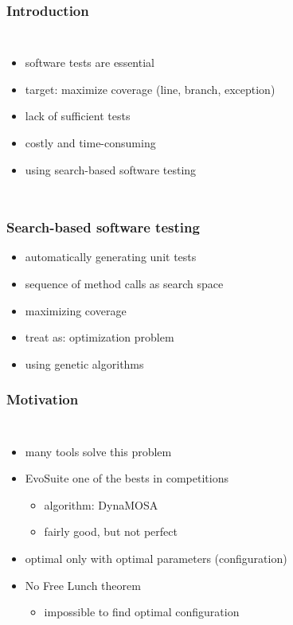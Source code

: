 \begin{frame}
	\frametitle{Introduction}
	
	\begin{columns}[c]
		
		\column{\textwidth}
		\begin{itemize}
			\item software tests are essential
			\item target: maximize coverage (line, branch, exception)
			\item lack of sufficient tests
			\item costly and time-consuming
			\item using search-based software testing
		\end{itemize}
		
	\end{columns}
	
\end{frame}

\begin{frame}
	\frametitle{Search-based software testing}
	
	\begin{itemize}
		\item automatically generating unit tests
		\item sequence of method calls as search space
		\item maximizing coverage
		\item treat as: optimization problem
		\item using genetic algorithms
	\end{itemize}
			
	
\end{frame}

\begin{frame}
	\frametitle{Motivation}
	
	\begin{columns}[c]
		
		\column{\textwidth}
		\begin{itemize}
			\item many tools solve this problem
			\item EvoSuite one of the bests in competitions \cite{Panichella.2020}
			\begin{itemize}
				\item algorithm: DynaMOSA  
				\item fairly good, but not perfect \cite{Arcuri.2014}
			\end{itemize}
			\item optimal only with optimal parameters (configuration)
			\item No Free Lunch theorem \cite{Wolpert.1997}
				\begin{itemize}
					\item impossible to find optimal configuration
				\end{itemize}
		\end{itemize}
		
	\end{columns}
	
\end{frame}

